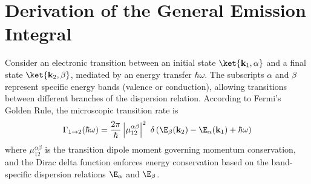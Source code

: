 \section{Derivation of the General Emission Integral}
\label{app:general_emission}

Consider an electronic transition between an initial state $\ket{\mathbf{k}_{1}, \alpha}$ and a final state $\ket{\mathbf{k}_{2}, \beta}$, mediated by an energy transfer $\hbar \omega$. The subscripts $\alpha$ and $\beta$ represent specific energy bands (valence or conduction), allowing transitions between different branches of the dispersion relation. According to Fermi's Golden Rule, the microscopic transition rate is
\begin{equation}
    \Gamma_{1\to 2}(\hbar\omega) = \frac{2\pi}{\hbar} \left|\mu_{12}^{\alpha\beta}\right|^{2} \ \delta\left(\E_{\beta}(\mathbf{k}_{2}) - \E_{\alpha}(\mathbf{k}_{1}) + \hbar\omega \right)
\end{equation}
where $\mu_{12}^{\alpha\beta}$ is the transition dipole moment governing momentum conservation, and the Dirac delta function enforces energy conservation based on the band-specific dispersion relations $\E_{\alpha}$ and $\E_{\beta}$.

